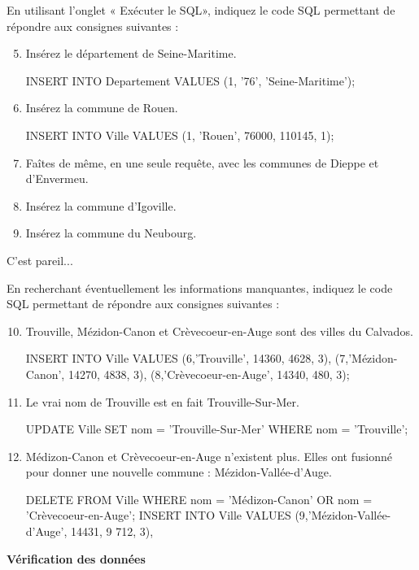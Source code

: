 \documentclass[a4paper,12pt,french]{book}
\begin{document}
En utilisant l’onglet « Exécuter le SQL», indiquez le code SQL permettant de répondre aux consignes suivantes :\\
\begin{enumerate}
	\setcounter{enumi}{4}
	\item 	Insérez le département de Seine-Maritime.
            \begin{sql}
INSERT INTO Departement VALUES (1, '76', 'Seine-Maritime');
            \end{sql}
	\item 	Insérez la commune de Rouen.
\begin{sql}
INSERT INTO Ville VALUES (1, 'Rouen', 76000, 110145, 1);
\end{sql}
	\item 	Faîtes de même, en une seule requête, avec les communes de Dieppe et d’Envermeu.
	\item 	Insérez la commune d’Igoville.
	\item 	Insérez la commune du Neubourg.	\\
\end{enumerate}
\begin{corrige}
C'est pareil...
\end{corrige}
En recherchant éventuellement les informations manquantes, indiquez le code SQL permettant de répondre aux consignes suivantes :\\
\begin{enumerate}
		\setcounter{enumi}{9}
	\item 	Trouville, Mézidon-Canon et Crèvecoeur-en-Auge sont des villes du Calvados.
    \begin{sql}
INSERT INTO Ville VALUES 
(6,'Trouville', 14360, 4628, 3),
(7,'Mézidon-Canon', 14270, 4838, 3),
(8,'Crèvecoeur-en-Auge', 14340, 480, 3);    
\end{sql}
	\item 	Le vrai nom de Trouville est en fait Trouville-Sur-Mer.	
\begin{sql}
UPDATE Ville
SET nom = 'Trouville-Sur-Mer'
WHERE nom = 'Trouville';
\end{sql}
	\item 	Médizon-Canon et Crèvecoeur-en-Auge n’existent plus. Elles ont fusionné pour donner une nouvelle commune : Mézidon-Vallée-d’Auge.\\
\begin{sql}
DELETE FROM Ville
WHERE nom = 'Médizon-Canon' OR nom = 'Crèvecoeur-en-Auge';
INSERT INTO Ville VALUES 
(9,'Mézidon-Vallée-d’Auge', 14431, 9 712, 3),

\end{sql}
\end{enumerate}
\textbf{Vérification des données}\\
\end{document}
